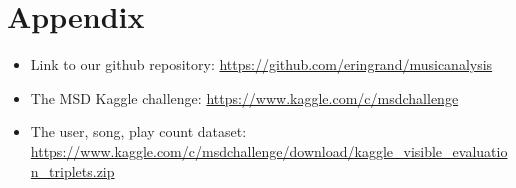 \documentclass[12pt,preprint]{aastex}
\begin{document}






\small{
\section{Appendix}

\begin{itemize}

  \item Link to our github repository: \url{https://github.com/eringrand/musicanalysis}
  \item The MSD Kaggle challenge: \url{https://www.kaggle.com/c/msdchallenge}
  \item The user, song, play count dataset: \url{https://www.kaggle.com/c/msdchallenge/download/kaggle_visible_evaluation_triplets.zip}

\end{itemize}
}
\end{document}
